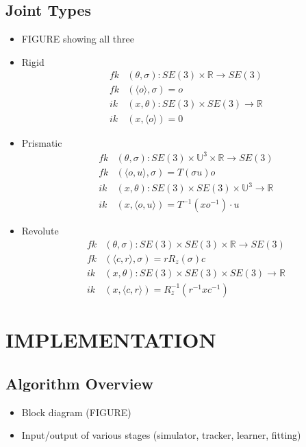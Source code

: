 \documentclass[letterpaper, 10 pt, conference]{ieeeconf}  %
\begin{document}
\subsection{Joint Types}
    \begin{itemize}
      \item FIGURE showing all three
      \item Rigid
        \begin{align}
          fk&(\theta, \sigma) : SE(3) \times \mathbb{R} \longrightarrow SE(3) \\
          fk&(\langle o \rangle, \sigma) = o \nonumber\\
          ik&(x, \theta) : SE(3) \times SE(3) \longrightarrow \mathbb{R} \\
          ik&(x, \langle o \rangle) = 0 \nonumber
        \end{align}
      \item Prismatic
        \begin{align}
          fk&(\theta, \sigma) : SE(3) \times \mathbb{U}^3 \times \mathbb{R} \longrightarrow SE(3) \\
          fk&(\langle o, u \rangle, \sigma) = T(\sigma u)o \nonumber\\
          ik&(x, \theta) : SE(3) \times SE(3) \times \mathbb{U}^3 \longrightarrow \mathbb{R} \\
          ik&(x, \langle o, u \rangle) = T^{-1}(xo^{-1}) \cdot u \nonumber
        \end{align}
      \item Revolute
        \begin{align}
          fk&(\theta, \sigma) : SE(3) \times SE(3) \times \mathbb{R} \longrightarrow SE(3) \\
          fk&(\langle c, r \rangle, \sigma) = r R_z(\sigma) c \nonumber\\
          ik&(x, \theta) : SE(3) \times SE(3) \times SE(3) \longrightarrow \mathbb{R} \\
          ik&(x, \langle c, r \rangle) = R_z^{-1}(r^{-1}xc^{-1}) \nonumber
        \end{align}
    \end{itemize}

\section{IMPLEMENTATION}

\subsection{Algorithm Overview}
    \begin{itemize}
      \item Block diagram (FIGURE)
      \item Input/output of various stages (simulator, tracker, learner, fitting)
    \end{itemize}
\end{document}
